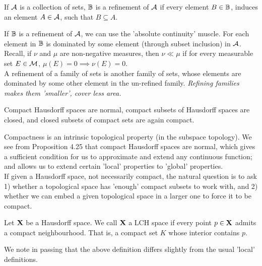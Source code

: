 \documentclass[../../main.tex]{subfiles}
\begin{document}
\begin{definition}[Refinement]\label{chp4:refinement-definition}
    If $\mathcal{A}$ is a collection of sets, ${\mathbb{B}}$ is a refinement of $\mathcal{A}$ if every element $B\in{\mathbb{B}}$, induces an element $A\in\mathcal{A}$, such that $B\subseteq A$.
\end{definition}
\begin{remark}
    If ${\mathbb{B}}$ is a refinement of $\mathcal{A}$, we can use the 'absolute continuity' muscle. For each element in ${\mathbb{B}}$ is dominated by some element (through subset inclusion) in $\mathcal{A}$. Recall, if $\nu$ and $\mu$ are non-negative measures, then $\nu\ll\mu$ if for every measurable set $E\in\mathcal{M}$, $\mu(E)=0\implies \nu(E)=0$.\\
    
    A refinement of a family of sets is another family of sets, whose elements are dominated by some other element in the un-refined family. \emph{Refining families makes them 'smaller', cover less area.}
\end{remark}

\begin{wts}
    Compact Hausdorff spaces are normal, compact subsets of Hausdorff spaces are closed, and closed subsets of compact sets are again compact. 
\end{wts}

\newpage

Compactness is an intrinsic topological property (in the subspace topology). We see from Proposition 4.25 that compact Hausdorff spaces are normal, which gives a sufficient condition for us to approximate and extend any continuous function; and allows us to extend certain 'local' properties to 'global' properties. \\

If given a Hausdorff space, not necessarily compact, the natural question is to ask 1) whether a topological space has 'enough' compact subsets to work with, and 2) whether we can embed a given topological space in a larger one to force it to be compact.

\begin{definition}\label{chp4:LCH-definition}
    Let ${\mathbf{X}}$ be a Hausdorff space. We call ${\mathbf{X}}$ a LCH space if every point $p\in{\mathbf{X}}$ admits a compact neighbourhood. That is, a compact set $K$ whose interior contains $p$.
\end{definition} 

We note in passing that the above definition differs slightly from the usual 'local' definitions.
\end{document}
